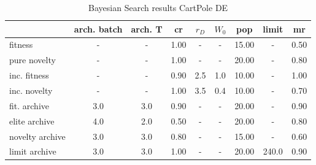\begin{table}[ht]
	\centering
	\scriptsize
	\setlength{\tabcolsep}{4pt}
	\renewcommand{\arraystretch}{1.15}
	\begin{tabular}{lcccccccc}
		\toprule
		{} & arch. batch & arch. T &   cr & $r_D$ & $W_0$ & pop &  limit &   mr \\
		\midrule
		fitness         &           - &       - & 1.00 &     - &     - & 15.00 &      - & 0.50 \\
		pure novelty    &           - &       - & 1.00 &     - &     - & 20.00 &      - & 0.80 \\
		inc. fitness    &           - &       - & 0.90 &   2.5 &   1.0 & 10.00 &      - & 1.00 \\
		inc. novelty    &           - &       - & 1.00 &   3.5 &   0.4 & 10.00 &      - & 0.70 \\
		fit. archive    &         3.0 &     3.0 & 0.90 &     - &     - & 20.00 &      - & 0.90 \\
		elite archive   &         4.0 &     2.0 & 0.50 &     - &     - & 20.00 &      - & 0.80 \\
		novelty archive &         3.0 &     3.0 & 0.80 &     - &     - & 15.00 &      - & 0.60 \\
		limit archive   &         3.0 &     3.0 & 1.00 &     - &     - & 20.00 &  240.0 & 0.90 \\
		\bottomrule
	\end{tabular}
	
	\caption{Bayesian Search results CartPole DE}
		\label{tab:optunaRes2}
\end{table}

